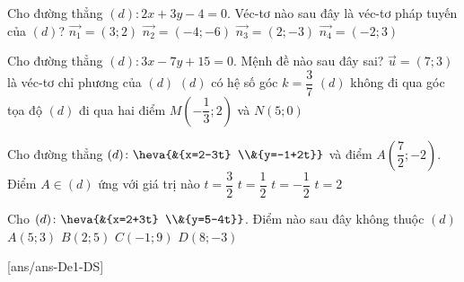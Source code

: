 \begin{ex}%
	Cho đường thẳng $(d)\colon 2x+3y-4=0$. Véc-tơ nào sau đây là véc-tơ pháp tuyến của $(d)$?
	\choice
	{$\overrightarrow{n_1}=\left(3;2\right)$}
	{\True $\overrightarrow{n_2}=\left(-4;-6\right)$}
	{$\overrightarrow{n_3}=\left(2;-3\right)$}
	{$\overrightarrow{n_4}=\left(-2;3\right)$}
\end{ex}
\begin{ex}%
	Cho đường thẳng $(d)\colon 3x-7y+15=0$. Mệnh đề nào sau đây sai?
	\choice
	{$\overrightarrow{u}=\left(7;3\right)$ là véc-tơ chỉ phương của $(d)$}
	{$(d)$ có hệ số góc $k=\dfrac{3}{7}$}
	{$(d)$ không đi qua góc tọa độ}
	{\True $(d)$ đi qua hai điểm $M\left(-\dfrac{1}{3};2\right)$ và $N\left(5;0\right)$}
\end{ex}
\begin{ex}%
	Cho đường thẳng $(d)\colon \heva{&{x=2-3t} \\&{y=-1+2t}}$ và điểm $A\left(\dfrac{7}{2};-2\right)$. Điểm $A\in (d)$ ứng với giá trị nào
	\choice
	{$t=\dfrac{3}{2}$}
	{$t=\dfrac{1}{2}$}
	{\True $t=-\dfrac{1}{2}$}
	{$t=2$}
\end{ex}
\begin{ex}%
	Cho $(d)\colon \heva{&{x=2+3t} \\&{y=5-4t}}$. Điểm nào sau đây không thuộc $(d)$
	\choice
	{$A(5;3)$}
	{\True $B(2;5)$}
	{$C(-1 ; 9)$}
	{$D(8 ;-3)$}
\end{ex}
\cauds
{}[ans/ans-De1-DS]
